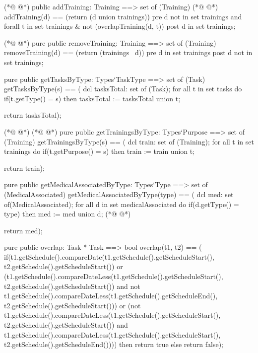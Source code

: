 \begin{vdmpp}[breaklines=true]
(*@
\label{addTraining:53}
@*)
 public addTraining: Training ==> set of (Training)
(*@
\label{getTasksByType:54}
@*)
  addTraining(d) == (return ({d} union trainings))
 pre d not in set trainings and forall t in set trainings & not (overlapTraining(d, t))
 post d in set trainings;
  
(*@
\label{removeTraining:58}
@*)
 pure public removeTraining: Training ==> set of (Training)
  removeTraining(d) == (return (trainings \ {d}))
 pre d in set trainings
 post d not in set trainings;
 
 pure public getTasksByType: Types`TaskType ==> set of (Task)
  getTasksByType(s) == (
              dcl tasksTotal: set of (Task);
              for all t in set tasks do
               if(t.getType() = s)
                then tasksTotal := tasksTotal union {t};
                
              return tasksTotal);
              
(*@
\label{getTrainingsByType:72}
@*)
(*@
\label{getMedicalAssociatedByType:72}
@*)
 pure public getTrainingsByType: Types`Purpose ==> set of (Training)
  getTrainingsByType(s) == (
              dcl train: set of (Training);
              for all t in set trainings do
               if(t.getPurpose() = s)
                then train := train union {t};
                
              return train);

 pure public getMedicalAssociatedByType: Types`Type ==> set of (MedicalAssociated)
  getMedicalAssociatedByType(type) == (
           dcl med: set of(MedicalAssociated);
           for all d in set medicalAssociated do
            if(d.getType() = type)
             then med := med union {d};
(*@
\label{overlap:87}
@*)
            
           return med);
           
 pure public overlap: Task * Task ==> bool
  overlap(t1, t2) == (
             if(t1.getSchedule().compareDate(t1.getSchedule().getScheduleStart(), t2.getSchedule().getScheduleStart()) 
              or (t1.getSchedule().compareDateLess(t1.getSchedule().getScheduleStart(), t2.getSchedule().getScheduleStart()) 
              and not t1.getSchedule().compareDateLess(t1.getSchedule().getScheduleEnd(), t2.getSchedule().getScheduleStart()))
              or (not t1.getSchedule().compareDateLess(t1.getSchedule().getScheduleStart(), t2.getSchedule().getScheduleStart()) 
              and t1.getSchedule().compareDateLess(t1.getSchedule().getScheduleStart(), t2.getSchedule().getScheduleEnd())))
              then return true
             else
              return false);
              

\end{vdmpp}
